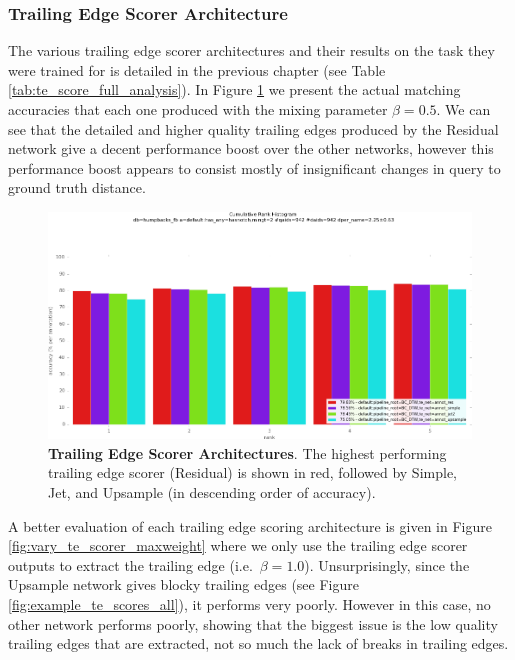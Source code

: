 \subsubsection{Trailing Edge Scorer Architecture}

The various trailing edge scorer architectures and their results on the task they were trained for is detailed in the previous chapter (see Table \ref{tab:te_score_full_analysis}).
In Figure \ref{fig:vary_te_scorer} we present the actual matching accuracies that each one produced with the mixing parameter $\beta = 0.5$.
We can see that the detailed and higher quality trailing edges produced by the Residual network give a decent performance boost over the other networks, however this performance boost appears to consist mostly of insignificant changes in query to ground truth distance.

\begin{figure}[t]%
\centering
\includegraphics[width=1\textwidth]{../images/results/vary_te_scorer.png}
\caption{\textbf{Trailing Edge Scorer Architectures}. The highest performing trailing edge scorer (Residual) is shown in red, followed by Simple, Jet, and Upsample (in descending order of accuracy).}
\label{fig:vary_te_scorer}
\end{figure}

A better evaluation of each trailing edge scoring architecture is given in Figure \ref{fig:vary_te_scorer_maxweight} where we only use the trailing edge scorer outputs to extract the trailing edge (i.e.\ $\beta = 1.0$).
Unsurprisingly, since the Upsample network gives blocky trailing edges (see Figure \ref{fig:example_te_scores_all}), it performs very poorly.
However in this case, no other network performs poorly, showing that the biggest issue is the low quality trailing edges that are extracted, not so much the lack of breaks in trailing edges.

